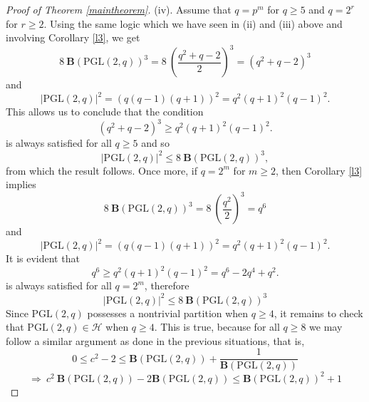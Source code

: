 \documentclass{amsart}
\theoremstyle{definition}
\numberwithin{equation}{section}
\begin{document}
\begin{proof}[Proof of Theorem \ref{maintheorem}]
    (iv). Assume that $q=p^m$ for $q \ge 5$ and $q=2^r$ for $r \geq 2$. Using the same logic which we have seen in (ii) and (iii) above and involving Corollary \ref{l3}, we get
\begin{equation}
8 \ \mathbf{B}(\mathrm{PGL}(2, q))^3 = 8 \  \left(\frac{q^2+q-2}{2}\right)^3=  (q^2+q-2)^3
\end{equation}
and 
\begin{equation}|\mathrm{PGL}(2, q)|^2= (q(q-1)(q+1))^2=q^2(q+1)^2(q-1)^2.  \end{equation}
This allows us to conclude that the condition
\begin{equation} (q^2+q-2)^3 \ge  q^2(q+1)^2(q-1)^2.
\end{equation} 
is always satisfied for all $q \ge 5$ and so
\begin{equation}|\mathrm{PGL}(2, q)|^2  \le  8  \ \mathbf{B}(\mathrm{PGL}(2, q))^3,
\end{equation}
from which the result follows.  Once more, if $q=2^m$ for $m\geq 2$, then Corollary \ref{l3} implies
\begin{equation} 8 \ \mathbf{B}(\mathrm{PGL}(2, q))^3 = 8 \ \left(\frac{q^2}{2}\right)^3 =q^{6} \end{equation} and \begin{equation}|\mathrm{PGL}(2, q)|^2= (q(q-1)(q+1))^2=q^2(q+1)^2(q-1)^2. \end{equation}
It is evident that \begin{equation} q^{6} \ge q^2(q+1)^2(q-1)^2=q^6-2q^4+q^2. \end{equation} is always satisfied for all $q=2^m$, therefore \begin{equation}|\mathrm{PGL}(2, q)|^2 \le 8 \ \mathbf{B}(\mathrm{PGL}(2, q))^3 \end{equation}
Since $\mathrm{PGL}(2, q)$ possesses a nontrivial partition when $q \ge 4$,  it remains to check that $\mathrm{PGL}(2, q) \in \mathcal{H}$ when $q \ge 4$.   This is true, because for all $q \ge 8$ we may follow a similar argument as done in the previous situations, that is, 
\begin{equation} 0 \le c^2 -2   \le  {\mathbf{B}(\mathrm{PGL}(2,q))} + \frac{1}{\mathbf{B}(\mathrm{PGL}(2, q))}
\end{equation}   
\begin{equation}
\Longrightarrow  \  c^2 \  {\mathbf{B}(\mathrm{PGL}(2,q))}  - 2  {\mathbf{B}(\mathrm{PGL}(2,q))} \le  {\mathbf{B}(\mathrm{PGL}(2,q))}^2  +1  
\end{equation}   
\begin{equation}

\end{equation}
\end{proof}
\end{document}
